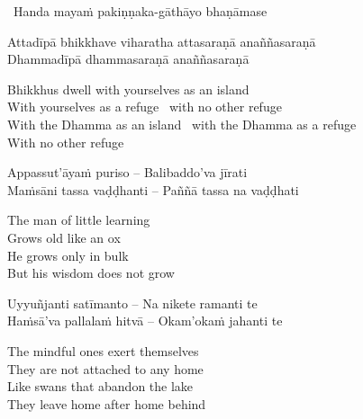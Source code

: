 \begin{leader}
  \anglebracketleft\ \hspace{-0.5mm}Handa mayaṁ pakiṇṇaka-gāthāyo bhaṇāmase \hspace{-0.5mm}\anglebracketright\
\end{leader}

\begin{verses}
  Attadīpā bhikkhave viharatha attasaraṇā anaññasaraṇā\\
  Dhammadīpā dhammasaraṇā anaññasaraṇā
\end{verses}

\begin{english-verses}
  Bhikkhus dwell with yourselves as an island\\
  With yourselves as a refuge \breathmark\ with no other refuge\\
  With the Dhamma as an island \breathmark\ with the Dhamma as a refuge\\
  With no other refuge
\end{english-verses}

\suttaRef{[SN 22.43]}

\begin{verses}
  Appassut'āyaṁ puriso – Balibaddo'va jīrati\\
  Maṁsāni tassa vaḍḍhanti – Paññā tassa na vaḍḍhati
\end{verses}

\begin{english-verses}
  The man of little learning\\
  Grows old like an ox\\
  He grows only in bulk\\
  But his wisdom does not grow
\end{english-verses}

\suttaRef{[Dhp 152]}

\begin{verses}
  Uyyuñjanti satīmanto – Na nikete ramanti te\\
  Haṁsā'va pallalaṁ hitvā – Okam'okaṁ jahanti te
\end{verses}

\begin{english-verses}
  The mindful ones exert themselves\\
  They are not attached to any home\\
  Like swans that abandon the lake\\
  They leave home after home behind
\end{english-verses}


